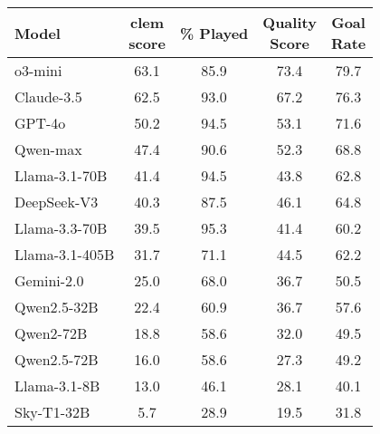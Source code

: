 \begin{tabular}{lcccc}
\hline
\textbf{Model} & \makecell{\textbf{clem} \\\textbf{score}} & \textbf{\% Played} & \makecell{\textbf{Quality} \\\textbf{Score}} &  \makecell{\textbf{Goal} \\\textbf{Rate}} \\
\hline
o3-mini & 63.1 & 85.9 & 73.4 & 79.7 \\
Claude-3.5 & 62.5 & 93.0 & 67.2 & 76.3 \\
GPT-4o & 50.2 & 94.5 & 53.1 & 71.6 \\
Qwen-max & 47.4 & 90.6 & 52.3 & 68.8 \\
Llama-3.1-70B & 41.4 & 94.5 & 43.8 & 62.8 \\
DeepSeek-V3 & 40.3 & 87.5 & 46.1 & 64.8 \\
Llama-3.3-70B & 39.5 & 95.3 & 41.4 & 60.2 \\
Llama-3.1-405B & 31.7 & 71.1 & 44.5 & 62.2 \\
Gemini-2.0 & 25.0 & 68.0 & 36.7 & 50.5 \\
Qwen2.5-32B & 22.4 & 60.9 & 36.7 & 57.6 \\
Qwen2-72B & 18.8 & 58.6 & 32.0 & 49.5 \\
Qwen2.5-72B & 16.0 & 58.6 & 27.3 & 49.2 \\
Llama-3.1-8B & 13.0 & 46.1 & 28.1 & 40.1 \\
Sky-T1-32B & 5.7 & 28.9 & 19.5 & 31.8 \\
\hline
\end{tabular}
